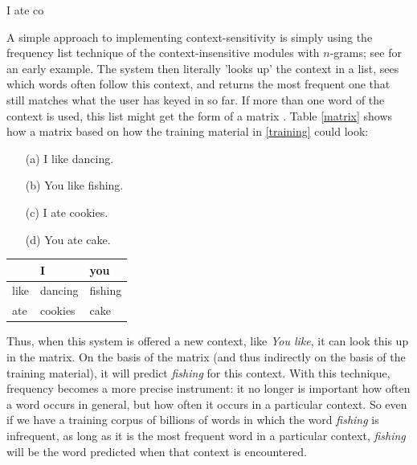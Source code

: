 \documentclass[11pt]{article}
\begin{document}
\begin{examples}
\item I ate co \label{iate}
\end{examples}

A simple approach to implementing context-sensitivity is simply using the frequency list technique of the context-insensitive modules with $n$-grams;  see \cite{hunnicutt87} for an early example. The system then literally 'looks up' the context in a list, sees which words often follow this context, and returns the most frequent one that still matches what the user has keyed in so far. If more than one word of the context is used, this list might get the form of a matrix \cite{Garay-Vitoria+06}. Table \ref{matrix} shows how a matrix based on how the training material in \ref{training} could look:

\begin{examples}

\item 

\begin{itemize} \label{training}
\item[(a)] I like dancing.
\item[(b)] You like fishing.
\item[(c)] I ate cookies.
\item[(d)] You ate cake.
\end{itemize}

\item \begin{tabular}{l|ll}
&I&you\\
\hline
like&dancing&fishing\\
ate&cookies&cake\\
\end{tabular} \label{matrix}

\end{examples}

Thus, when this system is offered a new context, like \emph{You like}, it can look this up in the matrix. On the basis of the matrix (and thus indirectly on the basis of the training material), it will predict \emph{fishing} for this context. With this technique, frequency becomes a more precise instrument: it no longer is important how often a word occurs in general, but how often it occurs in a particular context. So even if we have a training corpus of billions of words in which the word \emph{fishing} is infrequent, as long as it is the most frequent word in a particular context, \emph{fishing} will be the word predicted when that context is encountered.
\end{document}
